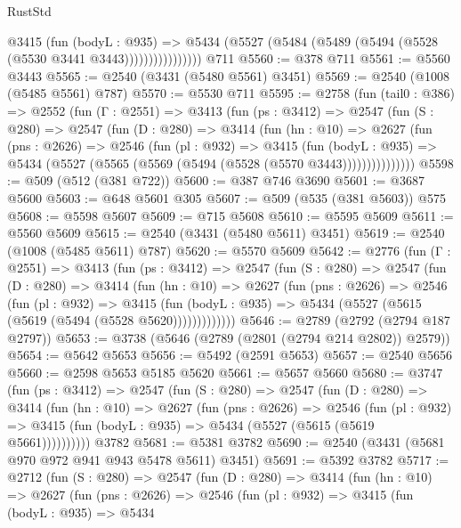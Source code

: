 \begin{lexlean}{RustStd}
\begin{coremodule}
                    @3415
                      (fun (bodyL : @935) =>
                      @5434 (@5527 (@5484 (@5489 (@5494 (@5528 (@5530 @3441 @3443))))))))))))))))
    @711
@5560 := @378 @711
@5561 := @5560 @3443
@5565 := @2540 (@3431 (@5480 @5561) @3451)
@5569 := @2540 (@1008 (@5485 @5561) @787)
@5570 := @5530 @711
@5595 := @2758
    (fun (tail0 : @386) =>
    @2552
      (fun (Γ : @2551) =>
      @3413
        (fun (ps : @3412) =>
        @2547
          (fun (S : @280) =>
          @2547
            (fun (D : @280) =>
            @3414
              (fun (hn : @10) =>
              @2627
                (fun (pns : @2626) =>
                @2546
                  (fun (pl : @932) =>
                  @3415
                    (fun (bodyL : @935) =>
                    @5434 (@5527 (@5565 (@5569 (@5494 (@5528 (@5570 @3443)))))))))))))))
@5598 := @509 (@512 (@381 @722))
@5600 := @387 @746 @3690
@5601 := @3687 @5600
@5603 := @648 @5601 @305
@5607 := @509 (@535 (@381 @5603)) @575
@5608 := @5598 @5607
@5609 := @715 @5608
@5610 := @5595 @5609
@5611 := @5560 @5609
@5615 := @2540 (@3431 (@5480 @5611) @3451)
@5619 := @2540 (@1008 (@5485 @5611) @787)
@5620 := @5570 @5609
@5642 := @2776
    (fun (Γ : @2551) =>
    @3413
      (fun (ps : @3412) =>
      @2547
        (fun (S : @280) =>
        @2547
          (fun (D : @280) =>
          @3414
            (fun (hn : @10) =>
            @2627
              (fun (pns : @2626) =>
              @2546
                (fun (pl : @932) =>
                @3415
                  (fun (bodyL : @935) => @5434 (@5527 (@5615 (@5619 (@5494 (@5528 @5620)))))))))))))
@5646 := @2789 (@2792 (@2794 @187 @2797))
@5653 := @3738 (@5646 (@2789 (@2801 (@2794 @214 @2802)) @2579))
@5654 := @5642 @5653
@5656 := @5492 (@2591 @5653)
@5657 := @2540 @5656
@5660 := @2598 @5653 @5185 @5620
@5661 := @5657 @5660
@5680 := @3747
    (fun (ps : @3412) =>
    @2547
      (fun (S : @280) =>
      @2547
        (fun (D : @280) =>
        @3414
          (fun (hn : @10) =>
          @2627
            (fun (pns : @2626) =>
            @2546
              (fun (pl : @932) =>
              @3415 (fun (bodyL : @935) => @5434 (@5527 (@5615 (@5619 @5661))))))))))
    @3782
@5681 := @5381 @3782
@5690 := @2540 (@3431 (@5681 @970 @972 @941 @943 @5478 @5611) @3451)
@5691 := @5392 @3782
@5717 := @2712
    (fun (S : @280) =>
    @2547
      (fun (D : @280) =>
      @3414
        (fun (hn : @10) =>
        @2627
          (fun (pns : @2626) =>
          @2546
            (fun (pl : @932) =>
            @3415
              (fun (bodyL : @935) =>
              @5434

\end{coremodule}
\end{lexlean}
